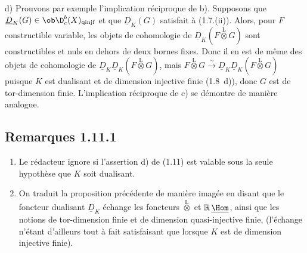 d)
Prouvons par exemple l'implication réciproque de b). Supposons que $\underline{D}_K(G) \in \ob \D_c^{b}(X)_{\mathrm{qinjf}}$ et que $\underline{D}_K(G)$ satisfait à (1.7.(ii)). Alors, pour $F$ constructible variable, les objets de cohomologie de $\underline{D}_K(F \mathop{\otimes}\limits^{\mathrm{L}} G)$ sont constructibles et nuls en dehors de deux bornes fixes. Donc il en est de même des objets de cohomologie de $\underline{D}_K \underline{D}_K(F \mathop{\otimes}\limits^{\mathrm{L}} G)$, mais $F \mathop{\otimes}\limits^{\mathrm{L}} G \xrightarrow{\sim} \underline{D}_K \underline{D}_K(F \mathop{\otimes}\limits^{\mathrm{L}} G)$ puisque $K$ est dualisant et de dimension injective finie (1.8~d)), donc $G$ est de tor-dimension finie. L'implication réciproque de c) se démontre de manière analogue.

\subsection*{Remarques 1.11.1}
\begin{enumerate}
\item[a)] Le rédacteur ignore si l'assertion d) de (1.11) est valable sous la seule hypothèse que $K$ soit dualisant.
\item[b)] On traduit la proposition précédente de manière imagée en disant que le foncteur dualisant $\underline{D}_K$ échange les foncteurs $\mathop{\otimes}\limits^{\mathrm{L}}$ et $\mathbb{R}\,\underline{\Hom}$, ainsi que les notions de tor-dimension finie et de dimension quasi-injective finie, (l'échange n'étant d'ailleurs tout à fait satisfaisant que lorsque $K$ est de dimension injective finie).
\end{enumerate}

